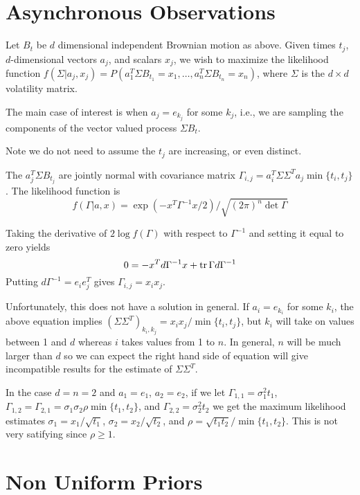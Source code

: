\documentclass[11pt,fleqn]{article}
\def\tr{\qopname\relax n{tr}}
\begin{document}
\section{Asynchronous Observations}
Let $B_t$ be $d$ dimensional independent Brownian motion
as above.
Given times $t_j$, $d$-dimensional vectors $a_j$, and
scalars $x_j$, we wish to maximize the likelihood function
$f(\Sigma|a_j, x_j) = P(a_1^T\Sigma B_{t_1} = x_1, \dots,
a_n^T\Sigma B_{t_n} = x_n)$,
where $\Sigma$ is the $d\times d$ volatility matrix.

The main case of interest is when $a_j = e_{k_j}$ for some $k_j$, i.e.,
we are sampling the components of the vector valued process $\Sigma B_t$.

Note we do not need to assume the $t_j$ are increasing, or even
distinct.

The $a_j^T\Sigma B_{t_j}$ are jointly normal with covariance matrix
$\Gamma_{i,j} = a_i^T\Sigma\Sigma^T a_j \min\{t_i, t_j\}$.
The likelihood function is
\begin{equation*}
    f(\Gamma|a, x) = \exp(-x^T\Gamma^{-1}x/2)/
            \sqrt{(2\pi)^n\det\Gamma}
\end{equation*}

Taking the derivative of $2\log f(\Gamma)$ with respect to $\Gamma^{-1}$
and setting it equal to zero yields
\begin{equation*}
    0 = -x^Td\Gamma^{-1}x + \tr\Gamma d\Gamma^{-1}
\end{equation*}
Putting $d\Gamma^{-1} = e_ie_j^T$ gives $\Gamma_{i,j} = x_i x_j$.

Unfortunately, this does not have a solution in general.
If $a_i = e_{k_i}$ for some $k_i$, the above equation implies
$(\Sigma\Sigma^T)_{k_i,k_j} = x_i x_j/\min\{t_i, t_j\}$, but $k_i$
will take on values between 1 and $d$ whereas $i$ takes values from 1
to $n$. In general, $n$ will be much larger than $d$ so we can expect
the right hand side of equation will give incompatible results for the
estimate of $\Sigma\Sigma^T$.

In the case $d = n = 2$ and $a_1 = e_1$, $a_2 = e_2$, if we let
$\Gamma_{1,1} = \sigma_1^2 t_1$, $\Gamma_{1,2} = \Gamma_{2,1} = \sigma_1
\sigma_2 \rho \min\{t_1, t_2\}$, and $\Gamma_{2,2} = \sigma_2^2 t_2$
we get the maximum likelihood estimates $\sigma_1 = x_1/\sqrt{t_1}$,
$\sigma_2 = x_2/\sqrt{t_2}$, and $\rho = \sqrt{t_1 t_2}/\min\{t_1, t_2\}$.
This is not very satifying since $\rho\ge 1$.

\section{Non Uniform Priors}
\end{document}
